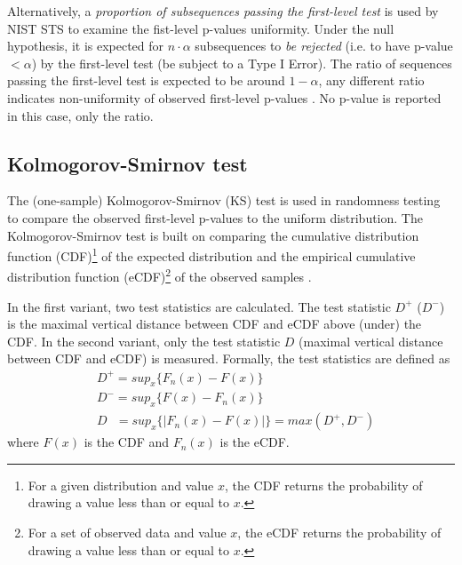 \documentclass[
  digital,     %
  oneside,     %
  nosansbold,  %
  nocolorbold, %
  nolof,         %
  nolot,         %
]{fithesis4}
\begin{document}
Alternatively, a \emph{proportion of subsequences passing the first-level test} is used by NIST STS to examine the fist-level p-values uniformity. Under the null hypothesis, it is expected for $n\cdot\alpha$ subsequences to \emph{be rejected} (i.e. to have p-value $< \alpha$) by the first-level test (be subject to a Type I Error). The ratio of sequences passing the first-level test is expected to be around $1-\alpha$, any different ratio indicates non-uniformity of observed first-level p-values \cite[p. 4-2]{nist_special}. No p-value is reported in this case, only the ratio.


\subsection{Kolmogorov-Smirnov test}
The (one-sample) Kolmogorov-Smirnov (KS) test is used in randomness testing to compare the observed first-level p-values to the uniform distribution. The Kolmogorov-Smirnov test is built on comparing the cumulative distribution function (CDF)\footnote{For a given distribution and value $x$, the CDF returns the probability of drawing a value less than or equal to $x$.} of the expected distribution and the empirical cumulative distribution function (eCDF)\footnote{For a set of observed data and value $x$, the eCDF returns the probability of drawing a value less than or equal to $x$.} of the observed samples \cite[p. 100]{GOF-techniques}. %

In the first variant, two test statistics are calculated. The test statistic $D^+$ ($D^-$) is the maximal vertical distance between CDF and eCDF above (under) the CDF. In the second variant, only the test statistic $D$ (maximal vertical distance between CDF and eCDF) is measured. Formally, the test statistics are defined as
\[\begin{split}
    &D^+ = sup_x\{F_n(x) - F(x)\}\\
    &D^- = sup_x\{F(x) - F_n(x)\}\\
    &D \:\:\:= sup_x\{|F_n(x) - F(x)|\} = max(D^+, D^-)
\end{split}
\] where $F(x)$ is the CDF and $F_n(x)$ is the  eCDF.
\end{document}
